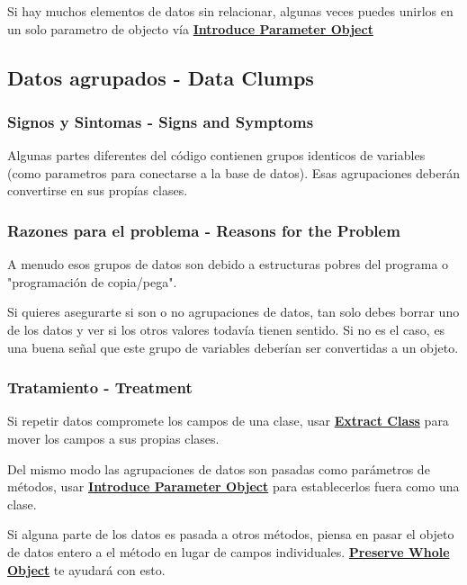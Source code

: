 \documentclass[11pt,a4paper,oneside]{book}
\begin{document}
Si hay muchos elementos de datos sin relacionar, algunas veces puedes unirlos en un solo parametro de objecto vía \hyperref[introduceparameterobject]{\textbf{Introduce Parameter Object}}



\subsection{Datos agrupados -   Data Clumps}
\label{dataclumps}

\subsubsection{Signos y Sintomas - Signs and Symptoms}

Algunas partes diferentes del código contienen grupos identicos de variables (como parametros para conectarse a la base de datos). Esas agrupaciones deberán convertirse en sus propías clases.




\subsubsection{Razones para el problema - Reasons for the Problem}

A menudo esos grupos de datos son debido a estructuras pobres del programa o "programación de copia/pega".

Si quieres asegurarte si son o no agrupaciones de datos, tan solo debes borrar uno de los datos y ver si los otros valores todavía tienen sentido. Si no es el caso, es una buena señal que este grupo de variables deberían ser convertidas a un objeto.



\subsubsection{Tratamiento - Treatment}

Si repetir datos compromete los campos de una clase, usar \hyperref[extractclass]{\textbf{Extract Class}} para mover los campos a sus propias clases.

Del mismo modo las agrupaciones de datos son pasadas como parámetros de métodos, usar \hyperref[introduceparameterobject]{\textbf{Introduce Parameter Object}} para establecerlos fuera como una clase.

Si alguna parte de los datos es pasada a otros métodos, piensa en pasar el objeto de datos entero a el método en lugar de campos individuales. \hyperref[preservewholeobject]{\textbf{Preserve Whole Object}} te ayudará con esto.
\end{document}
